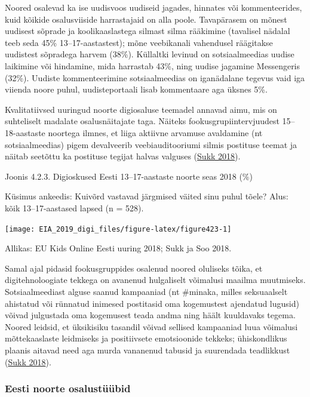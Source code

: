 \documentclass[estonian,]{article}
\begin{document}
Noored osalevad ka ise uudisvoos uudiseid jagades, hinnates või kommenteerides, kuid kõikide osalusviiside harrastajaid on alla poole. Tavapärasem on mõnest uudisest sõprade ja koolikaaslastega silmast silma rääkimine (tavalisel nädalal teeb seda 45\% 13--17-aastastest); mõne veebikanali vahendusel räägitakse uudistest sõpradega harvem (38\%). Küllaltki levinud on sotsiaalmeedias uudise laikimine või hindamine, mida harrastab 43\%, ning uudise jagamine Messengeris (32\%). Uudiste kommenteerimine sotsiaalmeedias on iganädalane tegevus vaid iga viienda noore puhul, uudisteportaali lisab kommentaare aga üksnes 5\%.

Kvalitatiivsed uuringud noorte digiosaluse teemadel annavad aimu, mis on suhteliselt madalate osalusnäitajate taga. Näiteks fookusgrupiintervjuudest 15--18-aastaste noortega ilmnes, et liiga aktiivne arvamuse avaldamine (nt sotsiaalmeedias) pigem devalveerib veebiauditooriumi silmis postituse teemat ja näitab seetõttu ka postituse tegijat halvas valguses (\protect\hyperlink{Sukk2018}{Sukk 2018}).

{Joonis 4.2.3.} Digioskused Eesti 13--17-aastaste noorte seas 2018 (\%)

Küsimus ankeedis: Kuivõrd vastavad järgmised väited sinu puhul tõele?
Alus: kõik 13--17-aastased lapsed (n = 528).

\begin{center}\texttt{[image: EIA\_2019\_digi\_files/figure-latex/figure423-1]} \end{center}

\begin{imgsource}
{Allikas:} EU Kids Online Eesti uuring 2018; Sukk ja Soo 2018.
\end{imgsource}

Samal ajal pidasid fookusgruppides osalenud noored oluliseks tõika, et digitehnoloogiate tekkega on avanenud hulgaliselt võimalusi maailma muutmiseks. Sotsiaalmeediast alguse saanud kampaaniad (nt \#minaka, milles seksuaalselt ahistatud või rünnatud inimesed postitasid oma kogemustest ajendatud lugusid) võivad julgustada oma kogemusest teada andma ning häält kuuldavaks tegema. Noored leidsid, et üksikisiku tasandil võivad sellised kampaaniad luua võimalusi mõttekaaslaste leidmiseks ja positiivsete emotsioonide tekkeks; ühiskondlikus plaanis aitavad need aga murda vananenud tabusid ja suurendada teadlikkust (\protect\hyperlink{Sukk2018}{Sukk 2018}).

\hypertarget{eesti-noorte-osalustuxfcuxfcbid}{%
\subsubsection*{Eesti noorte osalustüübid}\label{eesti-noorte-osalustuxfcuxfcbid}}
\end{document}
